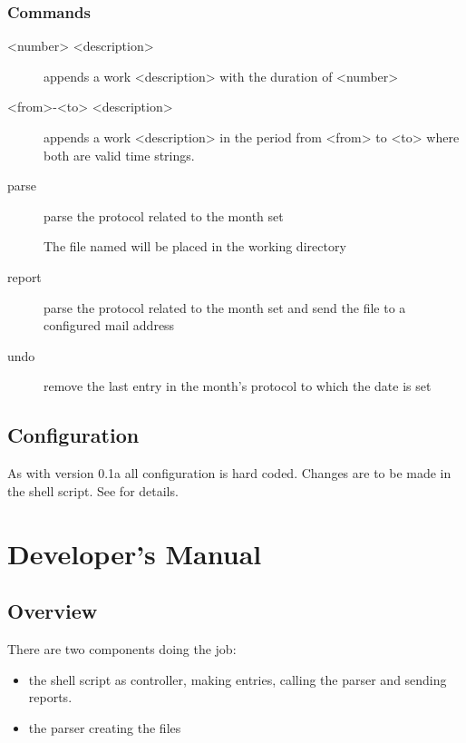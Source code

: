 \documentclass[letterpaper,10pt,english]{sphinxmanual}
\begin{document}
\subsubsection{Commands}
\label{\detokenize{usermanual:commands}}\begin{description}
\item[{\textless{}number\textgreater{} \textless{}description\textgreater{}}] \leavevmode
appends a work \textless{}description\textgreater{} with the duration of \textless{}number\textgreater{}

\item[{\textless{}from\textgreater{}-\textless{}to\textgreater{} \textless{}description\textgreater{}}] \leavevmode
appends a work \textless{}description\textgreater{} in the period from \textless{}from\textgreater{} to \textless{}to\textgreater{} where both are  valid time strings.

\item[{parse}] \leavevmode
parse the protocol related to the month set

The file named  will be placed in the working directory

\item[{report}] \leavevmode
parse the protocol related to the month set and send the  file to a configured mail address

\item[{undo}] \leavevmode
remove the last entry in the month’s protocol to which the date is set

\end{description}


\subsection{Configuration}
\label{\detokenize{usermanual:configuration}}
As with version 0.1a all configuration is hard coded. Changes are to be made in the shell script. See {\hyperref[\detokenize{devmanual::doc}]{}} for details.


\section{Developer’s Manual}
\label{\detokenize{devmanual::doc}}\label{\detokenize{devmanual:developers-manual}}

\subsection{Overview}
\label{\detokenize{devmanual:overview}}
There are two components doing the job:
\begin{itemize}
\item {} 
the shell script as controller, making entries, calling the parser and sending reports.

\item {} 
the parser creating the  files

\end{itemize}
\end{document}

